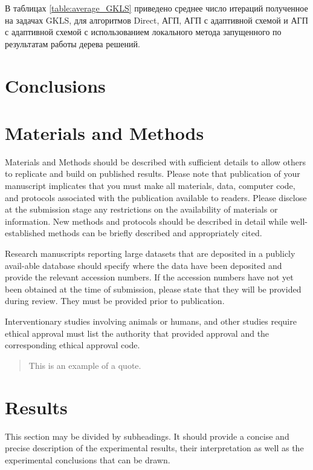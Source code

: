 \documentclass[entropy,article,submit,moreauthors,pdftex]{Definitions/mdpi}
\begin{document}
В таблицах \ref{table:average_GKLS} приведено среднее число итераций полученное на  задачах GKLS, для алгоритмов Direct, АГП, АГП с адаптивной схемой и АГП с адаптивной схемой с использованием локального метода запущенного по результатам работы дерева решений.



\section{Conclusions}


 
\section{Materials and Methods}

Materials and Methods should be described with sufficient details to allow others to replicate and build on published results. Please note that publication of your manuscript implicates that you must make all materials, data, computer code, and protocols associated with the publication available to readers. Please disclose at the submission stage any restrictions on the availability of materials or information. New methods and protocols should be described in detail while well-established methods can be briefly described and appropriately cited.

Research manuscripts reporting large datasets that are deposited in a publicly avail-able database should specify where the data have been deposited and provide the relevant accession numbers. If the accession numbers have not yet been obtained at the time of submission, please state that they will be provided during review. They must be provided prior to publication.

Interventionary studies involving animals or humans, and other studies require ethical approval must list the authority that provided approval and the corresponding ethical approval code.
\begin{quote}
This is an example of a quote.
\end{quote}

\section{Results}

This section may be divided by subheadings. It should provide a concise and precise description of the experimental results, their interpretation as well as the experimental conclusions that can be drawn.
\end{document}
